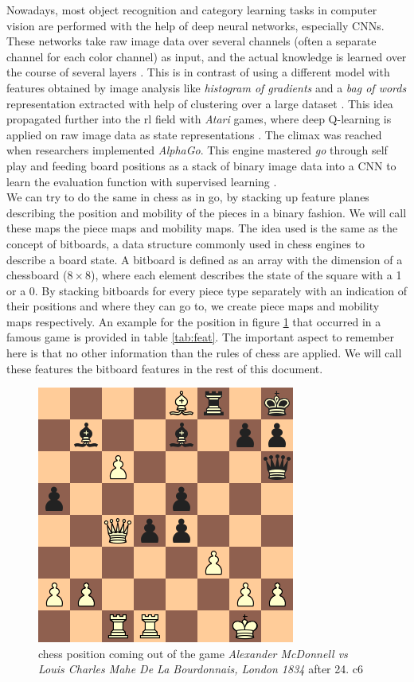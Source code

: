 Nowadays, most object recognition and category learning tasks in computer vision are performed with the help of deep neural networks, especially CNNs. These networks take raw image data over several channels (often a separate channel for each color channel) as input, and the actual knowledge is learned over the course of several layers \cite{kriz10}. This is in contrast of using a different model with features obtained by image analysis like \textit{histogram of gradients} and a \textit{bag of words} representation extracted with help of clustering over a large dataset \cite{lowe04}. This idea propagated further into the \gls{rl} field with \textit{Atari} games, where deep Q-learning is applied on raw image data as state representations \cite{silv13}. The climax was reached when researchers implemented \textit{AlphaGo}. This engine mastered \textit{go} through self play and feeding board positions as a stack of binary image data into a CNN to learn the evaluation function with supervised learning \cite{alphago16}.\\

We can try to do the same in chess as in go, by stacking up feature planes describing the position and mobility of the pieces in a binary fashion. We will call these maps the piece maps and mobility maps. The idea used is the same as the concept of bitboards, a data structure commonly used in chess engines to describe a board state. A bitboard is defined as an array with the dimension of a chessboard ($8\times8$), where each element describes the state of the square with a 1 or a 0. By stacking bitboards for every piece type separately with an indication of their positions and where they can go to, we create piece maps and mobility maps respectively. An example for the position in figure \ref{fig:feat} that occurred in a famous game is provided in table \ref{tab:feat}. The important aspect to remember here is that no other information than the rules of chess are applied. We will call these features the bitboard features in the rest of this document.\\  

\begin{figure}
\centering
\includegraphics[scale=0.5]{fig/diagram_feat}
\caption[Chess Position]{chess position coming out of the game \textit{Alexander McDonnell vs Louis Charles Mahe De La Bourdonnais, London 1834} after 24. c6}
\label{fig:feat}
\end{figure}

